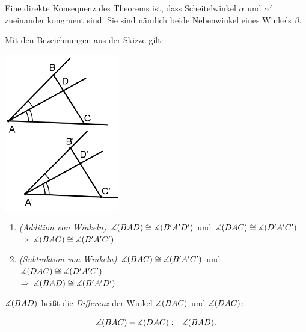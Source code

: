 Eine direkte Konsequenz des Theorems ist, dass Scheitelwinkel $\alpha$ und $\alpha'$ zueinander
kongruent sind. Sie sind nämlich beide Nebenwinkel eines Winkels $\beta$.

\begin{thm}\label{thm:satz.s1l}
    Mit den Bezeichnungen aus der Skizze gilt:


    \centerline{\includegraphics[width=5cm]{BILDER/1-2-15b-Winkel.png}}

    \renewcommand{\labelenumi}{\alph{enumi})} %
    \begin{enumerate}
        \item\label{thm:satz.s1l:item1} \emph{(Addition von Winkeln)} $\mbox{$\measuredangle$}(BAD) \cong \mbox{$\measuredangle$}(B'A'D')$
            und $\mbox{$\measuredangle$}(DAC) \cong \mbox{$\measuredangle$}(D'A'C')$\\ $\Rightarrow\;\mbox{$\measuredangle$}(BAC) \cong \mbox{$\measuredangle$}(B'A'C')$

        \item\label{thm:satz.s1l:item2} \emph{(Subtraktion von Winkeln)} $\mbox{$\measuredangle$}(BAC) \cong
            \mbox{$\measuredangle$}(B'A'C')$ und $\mbox{$\measuredangle$}(DAC) \cong \mbox{$\measuredangle$}(D'A'C')$\\
            $\Rightarrow\; \mbox{$\measuredangle$}(BAD) \cong \mbox{$\measuredangle$}(B'A'D')$
    \end{enumerate}
\end{thm}

$\mbox{$\measuredangle$}(BAD)$ heißt die \emph{Differenz} der Winkel $\mbox{$\measuredangle$}(BAC)$ und $\mbox{$\measuredangle$}(DAC)$:

$$
    \mbox{$\measuredangle$}(BAC) - \mbox{$\measuredangle$}(DAC) := \mbox{$\measuredangle$}(BAD).
$$

